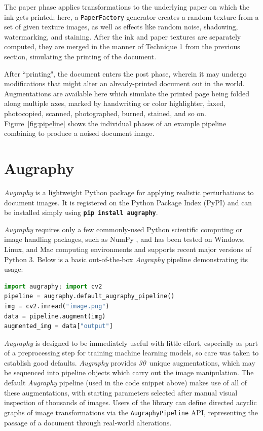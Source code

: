 \documentclass[runningheads]{llncs}
\newcommand{\numAugraphyAugmentations}{\emph{30}}
\begin{document}
The paper phase applies transformations to the underlying paper on which the ink gets printed; here, a \texttt{PaperFactory} generator creates a random texture from a set of given texture images, as well as effects like random noise, shadowing, watermarking, and staining.
After the ink and paper textures are separately computed, they are merged in the manner of Technique 1 from the previous section, simulating the printing of the document.

After ``printing", the document enters the post phase, wherein it may undergo modifications that might alter an already-printed document out in the world.
Augmentations are available here which simulate the printed page being folded along multiple axes, marked by handwriting or color highlighter, faxed, photocopied, scanned, photographed, burned, stained, and so on.
Figure~\ref{fig:pipeline} shows the individual phases of an example pipeline combining to produce a noised document image.

\section{Augraphy}

\emph{Augraphy} is a lightweight Python package for applying realistic perturbations to document images. It is registered on the Python Package Index (PyPI) and can be installed simply using \colorbox{superlightgray}{\textbf{\texttt{pip install augraphy}}}.

\emph{Augraphy} requires only a few commonly-used Python scientific computing or image handling packages, such as NumPy \cite{ref_numpy}, and has been tested on Windows, Linux, and Mac computing environments and supports recent major versions of Python 3. Below is a basic out-of-the-box \emph{Augraphy} pipeline demonstrating its usage:

\begin{lstlisting}[language=Python, label={lst:sample-code}, caption={Augmenting a document image with \emph{Augraphy}.}]
import augraphy; import cv2
pipeline = augraphy.default_augraphy_pipeline()
img = cv2.imread("image.png")
data = pipeline.augment(img)
augmented_img = data["output"]
\end{lstlisting}

\emph{Augraphy} is designed to be immediately useful with little effort, especially as part of a preprocessing step for training machine learning models, so care was taken to establish good defaults.
\emph{Augraphy} provides \numAugraphyAugmentations ~unique augmentations, which may be sequenced into pipeline objects which carry out the image manipulation. The default \emph{Augraphy} pipeline (used in the code snippet above) makes use of all of these augmentations, with starting parameters selected after manual visual inspection of thousands of images.
Users of the library can define directed acyclic graphs of image transformations via the \texttt{AugraphyPipeline} API, representing the passage of a document through real-world alterations.
\end{document}
